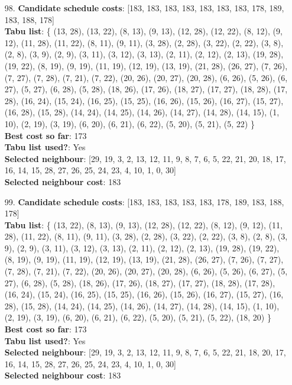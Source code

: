 \documentclass[fleqn]{article}
\begin{document}
\begin{itemize}
    \item[98.] \textbf{Candidate schedule costs}: [183, 183, 183, 183, 183, 183, 183, 178, 189, 183, 188, 178] \\
    \textbf{Tabu list}: \{ (13, 28), (13, 22), (8, 13), (9, 13), (12, 28), (12, 22), (8, 12), (9, 12), (11, 28), (11, 22), (8, 11), (9, 11), (3, 28), (2, 28), (3, 22), (2, 22), (3, 8), (2, 8), (3, 9), (2, 9), (3, 11), (3, 12), (3, 13), (2, 11), (2, 12), (2, 13), (19, 28), (19, 22), (8, 19), (9, 19), (11, 19), (12, 19), (13, 19), (21, 28), (26, 27), (7, 26), (7, 27), (7, 28), (7, 21), (7, 22), (20, 26), (20, 27), (20, 28), (6, 26), (5, 26), (6, 27), (5, 27), (6, 28), (5, 28), (18, 26), (17, 26), (18, 27), (17, 27), (18, 28), (17, 28), (16, 24), (15, 24), (16, 25), (15, 25), (16, 26), (15, 26), (16, 27), (15, 27), (16, 28), (15, 28), (14, 24), (14, 25), (14, 26), (14, 27), (14, 28), (14, 15), (1, 10), (2, 19), (3, 19), (6, 20), (6, 21), (6, 22), (5, 20), (5, 21), (5, 22) \} \\
    \textbf{Best cost so far}: 173 \\
    \textbf{Tabu list used?}: Yes \\
    \textbf{Selected neighbour}: [29, 19, 3, 2, 13, 12, 11, 9, 8, 7, 6, 5, 22, 21, 20, 18, 17, 16, 14, 15, 28, 27, 26, 25, 24, 23, 4, 10, 1, 0, 30] \\
    \textbf{Selected neighbour cost}: 183
      

    \item[99.] \textbf{Candidate schedule costs}: [183, 183, 183, 183, 183, 178, 189, 183, 188, 178] \\
    \textbf{Tabu list}: \{ (13, 22), (8, 13), (9, 13), (12, 28), (12, 22), (8, 12), (9, 12), (11, 28), (11, 22), (8, 11), (9, 11), (3, 28), (2, 28), (3, 22), (2, 22), (3, 8), (2, 8), (3, 9), (2, 9), (3, 11), (3, 12), (3, 13), (2, 11), (2, 12), (2, 13), (19, 28), (19, 22), (8, 19), (9, 19), (11, 19), (12, 19), (13, 19), (21, 28), (26, 27), (7, 26), (7, 27), (7, 28), (7, 21), (7, 22), (20, 26), (20, 27), (20, 28), (6, 26), (5, 26), (6, 27), (5, 27), (6, 28), (5, 28), (18, 26), (17, 26), (18, 27), (17, 27), (18, 28), (17, 28), (16, 24), (15, 24), (16, 25), (15, 25), (16, 26), (15, 26), (16, 27), (15, 27), (16, 28), (15, 28), (14, 24), (14, 25), (14, 26), (14, 27), (14, 28), (14, 15), (1, 10), (2, 19), (3, 19), (6, 20), (6, 21), (6, 22), (5, 20), (5, 21), (5, 22), (18, 20) \} \\
    \textbf{Best cost so far}: 173 \\
    \textbf{Tabu list used?}: Yes \\
    \textbf{Selected neighbour}: [29, 19, 3, 2, 13, 12, 11, 9, 8, 7, 6, 5, 22, 21, 18, 20, 17, 16, 14, 15, 28, 27, 26, 25, 24, 23, 4, 10, 1, 0, 30] \\
    \textbf{Selected neighbour cost}: 183
      


\end{itemize}
\end{document}
